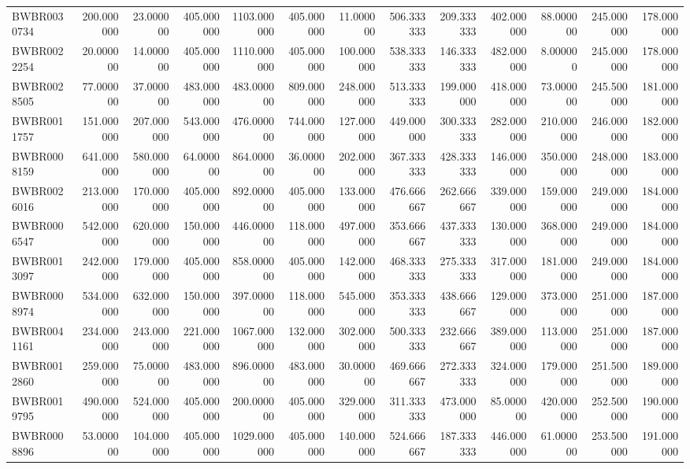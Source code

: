 \begin{longtable}{lrrrrrrrrrrrr}
BWBR0030734 & 200.000000 & 23.000000 & 405.000000 & 1103.000000 & 405.000000 & 11.000000 & 506.333333 & 209.333333 & 402.000000 & 88.000000 & 245.000000 & 178.000000 \\
BWBR0022254 & 20.000000 & 14.000000 & 405.000000 & 1110.000000 & 405.000000 & 100.000000 & 538.333333 & 146.333333 & 482.000000 & 8.000000 & 245.000000 & 178.000000 \\
BWBR0028505 & 77.000000 & 37.000000 & 483.000000 & 483.000000 & 809.000000 & 248.000000 & 513.333333 & 199.000000 & 418.000000 & 73.000000 & 245.500000 & 181.000000 \\
BWBR0011757 & 151.000000 & 207.000000 & 543.000000 & 476.000000 & 744.000000 & 127.000000 & 449.000000 & 300.333333 & 282.000000 & 210.000000 & 246.000000 & 182.000000 \\
BWBR0008159 & 641.000000 & 580.000000 & 64.000000 & 864.000000 & 36.000000 & 202.000000 & 367.333333 & 428.333333 & 146.000000 & 350.000000 & 248.000000 & 183.000000 \\
BWBR0026016 & 213.000000 & 170.000000 & 405.000000 & 892.000000 & 405.000000 & 133.000000 & 476.666667 & 262.666667 & 339.000000 & 159.000000 & 249.000000 & 184.000000 \\
BWBR0006547 & 542.000000 & 620.000000 & 150.000000 & 446.000000 & 118.000000 & 497.000000 & 353.666667 & 437.333333 & 130.000000 & 368.000000 & 249.000000 & 184.000000 \\
BWBR0013097 & 242.000000 & 179.000000 & 405.000000 & 858.000000 & 405.000000 & 142.000000 & 468.333333 & 275.333333 & 317.000000 & 181.000000 & 249.000000 & 184.000000 \\
BWBR0008974 & 534.000000 & 632.000000 & 150.000000 & 397.000000 & 118.000000 & 545.000000 & 353.333333 & 438.666667 & 129.000000 & 373.000000 & 251.000000 & 187.000000 \\
BWBR0041161 & 234.000000 & 243.000000 & 221.000000 & 1067.000000 & 132.000000 & 302.000000 & 500.333333 & 232.666667 & 389.000000 & 113.000000 & 251.000000 & 187.000000 \\
BWBR0012860 & 259.000000 & 75.000000 & 483.000000 & 896.000000 & 483.000000 & 30.000000 & 469.666667 & 272.333333 & 324.000000 & 179.000000 & 251.500000 & 189.000000 \\
BWBR0019795 & 490.000000 & 524.000000 & 405.000000 & 200.000000 & 405.000000 & 329.000000 & 311.333333 & 473.000000 & 85.000000 & 420.000000 & 252.500000 & 190.000000 \\
BWBR0008896 & 53.000000 & 104.000000 & 405.000000 & 1029.000000 & 405.000000 & 140.000000 & 524.666667 & 187.333333 & 446.000000 & 61.000000 & 253.500000 & 191.000000 \\

\end{longtable}

